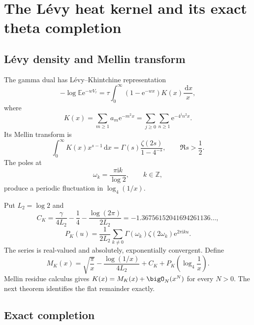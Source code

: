 \documentclass[11pt]{article}
\numberwithin{equation}{section}
\theoremstyle{definition}
\theoremstyle{remark}
\newcommand{\Z}{\mathbb Z}
\newcommand{\E}{\mathbb E}
\newcommand{\dd}{\,\mathrm d}
\newcommand{\e}{\mathrm e}
\newcommand{\ii}{\mathrm i}
\begin{document}
\section{The L\'evy heat kernel and its exact theta completion}

\subsection{L\'evy density and Mellin transform}

The gamma dual has L\'evy--Khintchine representation
\begin{equation}\label{p5:eq:Levy-Khintchine}
 -\log\E\e^{-wV_\tau}
 =\tau\int_0^\infty(1-\e^{-wx})K(x)\frac{\dd x}{x},
\end{equation}
where
\begin{equation}\label{p5:eq:K-def}
 K(x)=\sum_{m\ge1}a_m\e^{-m^2x}
 =\sum_{j\ge0}\sum_{n\ge1}\e^{-4^jn^2x}.
\end{equation}
Its Mellin transform is
\begin{equation}\label{p5:eq:K-Mellin}
 \int_0^\infty K(x)x^{s-1}\dd x
 =\Gamma(s)\frac{\zeta(2s)}{1-4^{-s}},
 \qquad \Re s>\frac12.
\end{equation}
The poles at
\begin{equation}\label{p5:eq:omega-k}
 \omega_k=\frac{\pi\ii k}{\log2},\qquad k\in\Z,
\end{equation}
produce a periodic fluctuation in $\log_4(1/x)$.

Put $L_2=\log2$ and
\begin{equation}\label{p5:eq:CK}
 C_K=\frac{\gamma}{4L_2}-\frac14-
 \frac{\log(2\pi)}{2L_2}
 =-1.36756152041694261136\ldots,
\end{equation}
\begin{equation}\label{p5:eq:PK}
 P_K(u)=\frac1{2L_2}\sum_{k\ne0}
 \Gamma(\omega_k)\zeta(2\omega_k)\e^{2\pi\ii ku}.
\end{equation}
The series is real-valued and absolutely, exponentially convergent.
Define
\begin{equation}\label{p5:eq:MK}
 M_K(x)=\sqrt{\frac\pi x}
 -\frac{\log(1/x)}{4L_2}+C_K
 +P_K\!\left(\log_4\frac1x\right).
\end{equation}
Mellin residue calculus gives $K(x)=M_K(x)+\bigO_N(x^N)$ for every $N>0$.
The next theorem identifies the flat remainder exactly.

\subsection{Exact completion}
\end{document}
